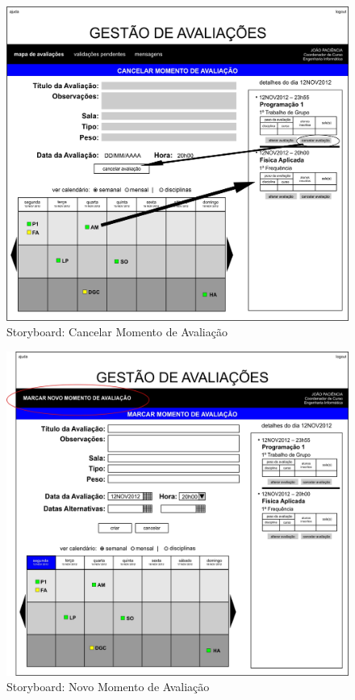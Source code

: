 \begin{figure}[!htbp]
\centering
\includegraphics{imagens/cancelar_momento_de_avaliacao_i.jpg}
\caption{Storyboard: Cancelar Momento de Avaliação}
\label{fig:cancelar_momento_de_avaliacao_i}
\end{figure}

\begin{figure}[!htbp]
\centering
\includegraphics{imagens/novo_momento_de_avaliacao_i.jpg}
\caption{Storyboard: Novo Momento de Avaliação}
\label{fig:novo_momento_de_avaliacao_i}
\end{figure}


